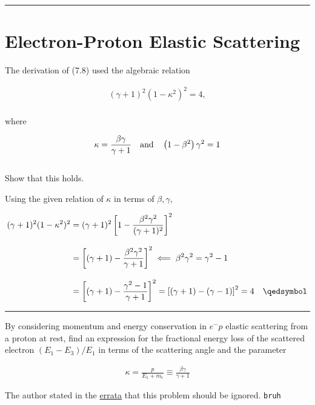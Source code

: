 
\noindent\rule{7in}{2.8pt}
\section{Electron-Proton Elastic Scattering}
    
\begin{problem}{7.1}
The derivation of (7.8) used the algebraic relation

\begin{align*}
    \left(\gamma+1\right)^2 \left(1-\kappa^2\right)^2 = 4,
\end{align*}\\
where 

\begin{align*}
    \kappa = \frac{\beta\gamma}{\gamma+1} \quad \text{and} \quad \left(1-\beta^2\right)\gamma^2 = 1
\end{align*}\\
Show that this holds.
\end{problem}
\begin{solution}
Using the given relation of $\kappa$ in terms of $\beta,\gamma$,

\begin{align*}
    (\gamma+1)^2 (1-\kappa^2)^2 &= (\gamma+1)^2 \left[ 1- \frac{\beta^2\gamma^2}{(\gamma+1)^2} \right]^2 \\[0.12in]
                                &= \left[ (\gamma+1) - \frac{\beta^2\gamma^2}{\gamma+1} \right]^2 \impliedby \beta^2\gamma^2 = \gamma^2 - 1 \\[0.12in]
                                &= \left[ (\gamma+1) - \frac{\gamma^2-1}{\gamma+1} \right]^2 = \left[ (\gamma+1) - (\gamma-1) \right]^2 = 4 \qed
\end{align*}
\end{solution}

\noindent\rule{7in}{1.5pt}


\begin{problem}{7.2}
    By considering momentum and energy conservation in $e^-p$ elastic scattering from a proton at rest, find an expression for the fractional energy loss of the scattered electron $\left( E_1 - E_3 \right)/E_1$ in terms of the scattering angle and the parameter

    \begin{align*}
        \kappa = \frac{p}{E_1 +m_e} \equiv \frac{\beta\gamma}{\gamma+1}
    \end{align*}
\end{problem}
\begin{solution}
The author stated in the \href{https://www.hep.phy.cam.ac.uk/~thomson/MPP/ModernParticlePhysics_Errata.pdf}{errata} that this problem should be ignored. \texttt{bruh}
\end{solution}

